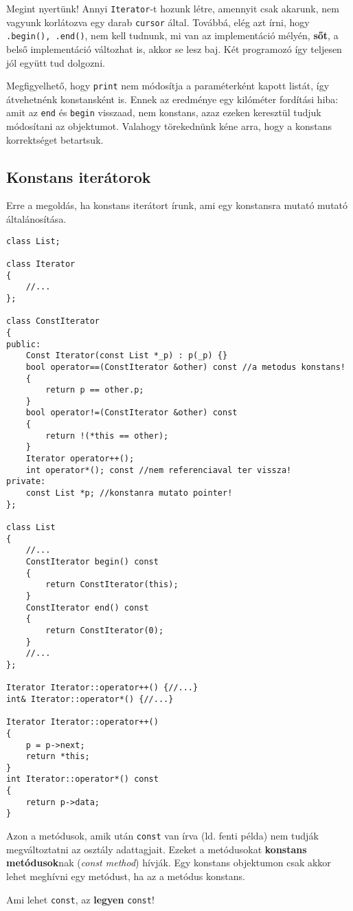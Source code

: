\documentclass[a4paper,11.5pt]{article}
\begin{document}
	\medskip
	Megint nyertünk! Annyi \texttt{Iterator}-t hozunk létre, amennyit csak akarunk, nem vagyunk korlátozva egy darab \texttt{cursor} által. Továbbá, elég azt írni, hogy \texttt{.begin(), .end()}, nem kell tudnunk, mi van az implementáció mélyén, \textbf{sőt}, a belső implementáció változhat is, akkor se lesz baj. Két programozó így teljesen jól együtt tud dolgozni.
	
	\medskip
	Megfigyelhető, hogy \texttt{print} nem módosítja a paraméterként kapott listát, így átvehetnénk konstansként is. Ennek az eredménye egy kilóméter fordítási hiba: amit az \texttt{end} és \texttt{begin} visszaad, nem konstans, azaz ezeken keresztül tudjuk módosítani az objektumot. Valahogy törekednünk kéne arra, hogy a konstans korrektséget betartsuk.
	\subsection{Konstans iterátorok}
	Erre a megoldás, ha konstans iterátort írunk, ami egy konstansra mutató mutató általánosítása.
\begin{lstlisting}
class List;

class Iterator
{
	//...
};

class ConstIterator
{
public:
	Const Iterator(const List *_p) : p(_p) {}
	bool operator==(ConstIterator &other) const //a metodus konstans!
	{
		return p == other.p;
	}
	bool operator!=(ConstIterator &other) const
	{
		return !(*this == other);
	}
	Iterator operator++();
	int operator*(); const //nem referenciaval ter vissza!
private:
	const List *p; //konstanra mutato pointer!
};

class List
{
	//...
	ConstIterator begin() const
	{
		return ConstIterator(this);	
	}
	ConstIterator end() const
	{
		return ConstIterator(0);	
	}
	//...
};

Iterator Iterator::operator++() {//...}
int& Iterator::operator*() {//...}

Iterator Iterator::operator++()
{
	p = p->next;
	return *this;
}
int Iterator::operator*() const
{
	return p->data;
}
\end{lstlisting}
	Azon a metódusok, amik után \texttt{const} van írva (ld. fenti példa) nem tudják megváltoztatni az osztály adattagjait. Ezeket a metódusokat \textbf{konstans metódusok}nak (\textit{const method}) hívják. Egy konstans objektumon csak akkor lehet meghívni egy metódust, ha az a metódus konstans.
	\begin{note}
		Ami lehet \texttt{const}, az \textbf{legyen} \texttt{const}!
	\end{note}
\end{document}
